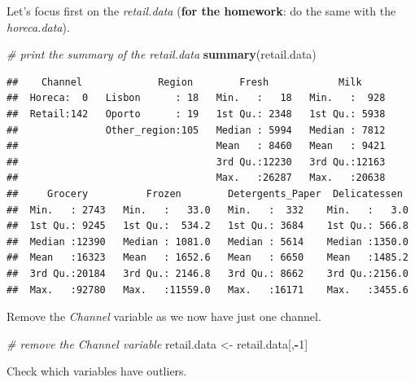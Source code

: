 \documentclass[]{article}
\newenvironment{Shaded}{\begin{snugshade}}{\end{snugshade}}
\newcommand{\KeywordTok}[1]{\textcolor[rgb]{0.13,0.29,0.53}{\textbf{#1}}}
\newcommand{\DataTypeTok}[1]{\textcolor[rgb]{0.13,0.29,0.53}{#1}}
\newcommand{\DecValTok}[1]{\textcolor[rgb]{0.00,0.00,0.81}{#1}}
\newcommand{\StringTok}[1]{\textcolor[rgb]{0.31,0.60,0.02}{#1}}
\newcommand{\CommentTok}[1]{\textcolor[rgb]{0.56,0.35,0.01}{\textit{#1}}}
\newcommand{\ControlFlowTok}[1]{\textcolor[rgb]{0.13,0.29,0.53}{\textbf{#1}}}
\newcommand{\OperatorTok}[1]{\textcolor[rgb]{0.81,0.36,0.00}{\textbf{#1}}}
\newcommand{\NormalTok}[1]{#1}
\begin{document}
Let's focus first on the \emph{retail.data} (\textbf{for the homework}:
do the same with the \emph{horeca.data}).

\begin{Shaded}
\begin{Highlighting}[]
\CommentTok{# print the summary of the retail.data}
\KeywordTok{summary}\NormalTok{(retail.data)}
\end{Highlighting}
\end{Shaded}

\begin{verbatim}
##    Channel             Region        Fresh            Milk      
##  Horeca:  0   Lisbon      : 18   Min.   :   18   Min.   :  928  
##  Retail:142   Oporto      : 19   1st Qu.: 2348   1st Qu.: 5938  
##               Other_region:105   Median : 5994   Median : 7812  
##                                  Mean   : 8460   Mean   : 9421  
##                                  3rd Qu.:12230   3rd Qu.:12163  
##                                  Max.   :26287   Max.   :20638  
##     Grocery          Frozen        Detergents_Paper  Delicatessen   
##  Min.   : 2743   Min.   :   33.0   Min.   :  332    Min.   :   3.0  
##  1st Qu.: 9245   1st Qu.:  534.2   1st Qu.: 3684    1st Qu.: 566.8  
##  Median :12390   Median : 1081.0   Median : 5614    Median :1350.0  
##  Mean   :16323   Mean   : 1652.6   Mean   : 6650    Mean   :1485.2  
##  3rd Qu.:20184   3rd Qu.: 2146.8   3rd Qu.: 8662    3rd Qu.:2156.0  
##  Max.   :92780   Max.   :11559.0   Max.   :16171    Max.   :3455.6
\end{verbatim}

Remove the \emph{Channel} variable as we now have just one channel.

\begin{Shaded}
\begin{Highlighting}[]
\CommentTok{# remove the Channel variable}
\NormalTok{retail.data <-}\StringTok{ }\NormalTok{retail.data[,}\OperatorTok{-}\DecValTok{1}\NormalTok{]}
\end{Highlighting}
\end{Shaded}

Check which variables have outliers.

\begin{Shaded}
\end{Shaded}
\end{document}
